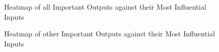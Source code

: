 \documentclass{article}
\begin{document}
  \begin{figure}[ht]
		\caption{Heatmap of all Important Outputs against their Most Influential Inputs}
	\end{figure}

  \begin{figure}[ht]
		\caption{Heatmap of other Important Outputs against their Most Influential Inputs}
	\end{figure}
	
\end{document}
